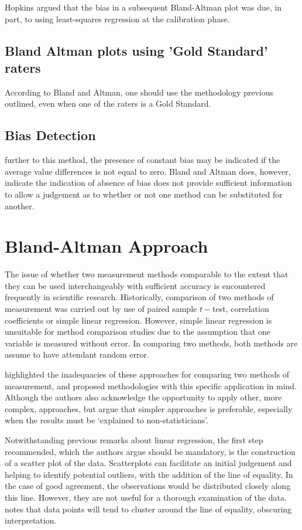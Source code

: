 \documentclass[Main.tex]{subfiles}
\begin{document}
Hopkins argued that the bias in a subsequent Bland-Altman plot was
due, in part, to using least-squares regression at the calibration
phase.

\subsection{Bland Altman plots using 'Gold Standard' raters}
According to Bland and Altman, one should use the methodology
previous outlined, even when one of the raters is a Gold Standard.


\subsection{Bias Detection}
further to this method, the presence of constant bias may be
indicated if the average value differences is not equal to zero.
Bland and Altman does, however, indicate the indication of absence
of bias does not provide sufficient information to allow a
judgement as to whether or not one method can be substituted for
another.


	\section{Bland-Altman Approach}
	The issue of whether two measurement methods comparable to the
	extent that they can be used interchangeably with sufficient
	accuracy is encountered frequently in scientific research.
	Historically, comparison of two methods of measurement was carried
	out by use of paired sample $t-$test, correlation coefficients or
	simple linear regression. However, simple linear regression is unsuitable for method comparison studies due to the assumption that one variable is measured without error. In comparing two methods, both methods are assume to have attendant random error.
	
	\citet{BA83} highlighted the inadequacies of these approaches for comparing two methods of measurement, and proposed methodologies with this specific application in mind. Although the authors also acknowledge the opportunity to apply other, more complex, approaches, but argue that simpler approaches is preferable, especially when the
	results must be `explained to non-statisticians'.
	
	Notwithstanding previous remarks about linear regression, the first step recommended, which the authors argue should be mandatory, is the construction of a scatter plot of the data. Scatterplots can facilitate an initial judgement and
	helping to identify potential outliers, with the addition of the line of equality. In the case of good agreement, the observations would be distributed closely along this line. However, they are not useful for a thorough examination of the data. \citet{BritHypSoc} notes that
	data points will tend to cluster around the line of equality, obscuring interpretation.
	
\end{document}
